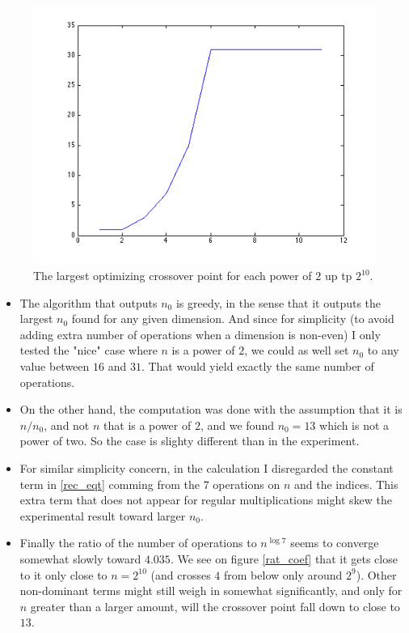 \documentclass{article}
\begin{document}
\begin{figure}[h]
\vspace{.2in}
\centerline {
	\includegraphics[scale=.6]{coef_expm.png}
}
\caption{The largest optimizing crossover point for each power of $ 2 $ up tp $ 2^{10} $. \label{coef_expm}}
\end{figure}
\begin{itemize}
\item The algorithm that outputs $ n_0 $ is greedy, in the sense that it outputs the largest $ n_0 $ found for any given dimension.
And since for simplicity (to avoid adding extra number of operations when a dimension is non-even) I only tested the "nice" case where $ n $ is a power of $ 2 $, we could as well set $ n_0 $ to any value between $ 16 $ and $ 31 $.  
That would yield exactly the same number of operations.  
\item On the other hand, the computation was done with the assumption that it is $ n/n_0 $, and not $ n $ that is a power of $ 2 $, and we found $ n_0 = 13 $ which is not a power of two.  
So the case is slighty different than in the experiment.
\item For similar simplicity concern, in the calculation I disregarded the constant term in \ref{rec_eqt} comming from the $ 7 $ operations on $ n $ and the indices.
This extra term that does not appear for regular multiplications might skew the experimental result toward larger $ n_0 $.
\item Finally the ratio of the number of operations to $ n^{\log 7} $ seems to converge somewhat slowly toward $ 4.035 $.  
We see on figure \ref{rat_coef} that it gets close to it only close to $ n = 2^{10} $ (and crosses $ 4 $ from below only around $ 2^9 $).  
Other non-dominant terms might still weigh in somewhat significantly, and only for $ n $ greater than a larger amount, will the crossover point fall down to close to $ 13 $.
\end{itemize}
\end{document}
